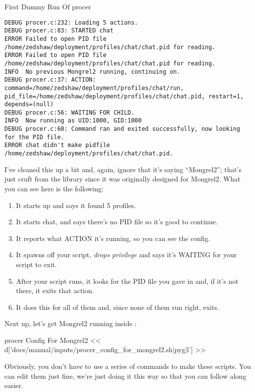 \begin{code}{First Dummy Run Of procer}
\begin{lstlisting}
DEBUG procer.c:232: Loading 5 actions.
DEBUG procer.c:83: STARTED chat
ERROR Failed to open PID file /home/zedshaw/deployment/profiles/chat/chat.pid for reading.
ERROR Failed to open PID file /home/zedshaw/deployment/profiles/chat/chat.pid for reading.
INFO  No previous Mongrel2 running, continuing on.
DEBUG procer.c:37: ACTION: command=/home/zedshaw/deployment/profiles/chat/run, pid_file=/home/zedshaw/deployment/profiles/chat/chat.pid, restart=1, depends=(null)
DEBUG procer.c:56: WAITING FOR CHILD.
INFO  Now running as UID:1000, GID:1000
DEBUG procer.c:60: Command ran and exited successfully, now looking for the PID file.
ERROR chat didn't make pidfile /home/zedshaw/deployment/profiles/chat/chat.pid.
\end{lstlisting}
\end{code}

I've cleaned this up a bit and, again, ignore that it's saying ``Mongrel2'';
that's just cruft from the library since it was originally designed
for Mongrel2.  What you can see here is the following:

\begin{enumerate}
\item It starts up and says it found 5 profiles.
\item It starts chat, and says there's no PID file so it's good to continue.
\item It reports what ACTION it's running, so you can see the config.
\item It spawns off your  script, \emph{drops privilege}
     and says it's WAITING for your script to exit.
\item After your script runs, it looks for the PID file you gave in  and, if it's not there, it exits that action.
\item It does this for all of them and, since none of them run right,  exits.
\end{enumerate}

Next up, let's get Mongrel2 running inside :

\begin{code}{procer Config For Mongrel2}
<< d['docs/manual/inputs/procer_config_for_mongrel2.sh|pyg|l'] >>
\end{code}

Obviously, you don't have to use a series of  commands to
make these scripts.  You can edit them just fine, we're just doing it
this way so that you can follow along easier.

